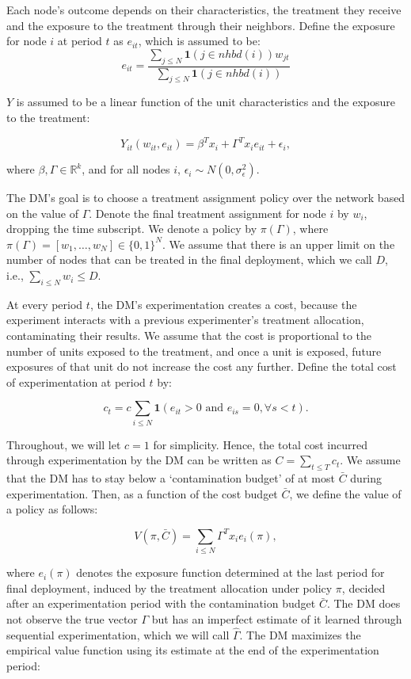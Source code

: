 \documentclass[11pt,a4paper]{article}
\begin{document}
Each node's outcome depends on their characteristics, the treatment they receive and the exposure to the treatment through their neighbors. Define the exposure for node $i$ at period $t$ as $e_{it}$, which is assumed to be: 
$$e_{it} = \frac { \sum_{j \leq N}  \mathbf{1}(j \in nhbd(i)) w_{jt}}{ \sum_{j \leq N} \mathbf{1}(j \in nhbd(i)) }$$

$Y$ is assumed to be a linear function of the unit characteristics and the exposure to the treatment:

$$Y_{it}( w_{it}, e_{it}) = \beta^T x_i + \Gamma^T x_i e_{it} + \epsilon_i,$$

where $\beta, \Gamma \in \mathbb{R}^k$, and for all nodes $i$, $\epsilon_i \sim N(0, \sigma^2_\epsilon)$.

 The DM's goal is to choose a treatment assignment policy over the network based on the value of $\Gamma$. Denote the final treatment assignment for node $i$ by $w_i$, dropping the time subscript. We denote a policy by $\pi(\Gamma)$, where $\pi(\Gamma)=[w_1, \dots , w_N] \in \{0,1\}^N$. We assume that there is an upper limit on the number of nodes that can be treated in the final deployment, which we call $D$, i.e., $\sum_{i \leq N} w_i \leq D$. 

At every period $t$, the DM's experimentation creates a cost, because the experiment interacts with a previous experimenter's treatment allocation, contaminating their results. We assume that the cost is proportional to the number of units exposed to the treatment, and once a unit is exposed, future exposures of that unit do not increase the cost any further. Define the total cost of experimentation at period $t$ by:

$$c_t = c \sum_{i \leq N} \mathbf{1}\left( e_{it} > 0 \mbox{ and } e_{is}=0,  \forall s<t \right) .$$

Throughout, we will let $c=1$ for simplicity. Hence, the total cost incurred through experimentation by the DM can be written as   $C= \sum_{t \leq T} c_t  .$ We assume that the DM has to stay below a `contamination budget' of at most $\bar{C}$ during experimentation. Then, as a function of the cost budget $\bar{C}$, we define the value of a policy as follows:

$$V(\pi, \bar{C})=\sum_{i \leq N} \Gamma^T x_i e_i(\pi), $$

where $e_i(\pi)$ denotes the exposure function determined at the last period for final deployment, induced by the treatment allocation under policy $\pi$, decided after an experimentation period with the contamination budget $\bar{C}$. The DM does not observe the true vector $\Gamma$ but has an imperfect estimate of it learned through sequential experimentation, which we will call $\hat \Gamma$. The DM maximizes the empirical value function using its estimate at the end of the experimentation period:
\end{document}
